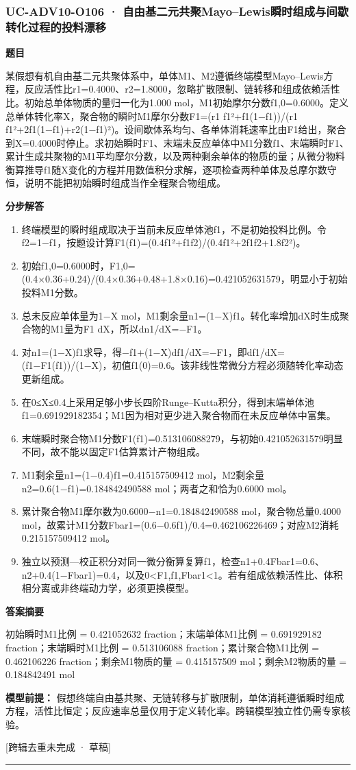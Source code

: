 \documentclass[UTF8,11pt,a4paper]{ctexart}
\begin{document}
\subsubsection*{UC-ADV10-O106 · 自由基二元共聚Mayo–Lewis瞬时组成与间歇转化过程的投料漂移}
\noindent\textbf{题目}\par
某假想有机自由基二元共聚体系中，单体M1、M2遵循终端模型Mayo–Lewis方程，反应活性比r1=0.4000、r2=1.8000，忽略扩散限制、链转移和组成依赖活性比。初始总单体物质的量归一化为1.000 mol，M1初始摩尔分数f1,0=0.6000。定义总单体转化率X，聚合物的瞬时M1摩尔分数F1=(r1 f1²+f1(1−f1))/(r1 f1²+2f1(1−f1)+r2(1−f1)²)。设间歇体系均匀、各单体消耗速率比由F1给出，聚合到X=0.4000时停止。求初始瞬时F1、末端未反应单体中M1分数f1、末端瞬时F1、累计生成共聚物的M1平均摩尔分数，以及两种剩余单体的物质的量；从微分物料衡算推导f1随X变化的方程并用数值积分求解，逐项检查两种单体及总摩尔数守恒，说明不能把初始瞬时组成当作全程聚合物组成。\par
\medskip\noindent\textbf{分步解答}
\begin{enumerate}
\item 终端模型的瞬时组成取决于当前未反应单体池f1，不是初始投料比例。令f2=1−f1，按题设计算F1(f1)=(0.4f1²+f1f2)/(0.4f1²+2f1f2+1.8f2²)。
\item 初始f1,0=0.6000时，F1,0=(0.4×0.36+0.24)/(0.4×0.36+0.48+1.8×0.16)=0.421052631579，明显小于初始投料M1分数。
\item 总未反应单体量为1−X mol，M1剩余量n1=(1−X)f1。转化率增加dX时生成聚合物的M1量为F1 dX，所以dn1/dX=−F1。
\item 对n1=(1−X)f1求导，得−f1+(1−X)df1/dX=−F1，即df1/dX=(f1−F1(f1))/(1−X)，初值f1(0)=0.6。该非线性常微分方程必须随转化率动态更新组成。
\item 在0≤X≤0.4上采用足够小步长四阶Runge–Kutta积分，得到末端单体池f1=0.691929182354；M1因为相对更少进入聚合物而在未反应单体中富集。
\item 末端瞬时聚合物M1分数F1(f1)=0.513106088279，与初始0.421052631579明显不同，故不能以固定F1估算累计产物组成。
\item M1剩余量n1=(1−0.4)f1=0.415157509412 mol，M2剩余量n2=0.6(1−f1)=0.184842490588 mol；两者之和恰为0.6000 mol。
\item 累计聚合物M1摩尔数为0.6000−n1=0.184842490588 mol，聚合物总量0.4000 mol，故累计M1分数Fbar1=(0.6−0.6f1)/0.4=0.462106226469；对应M2消耗0.215157509412 mol。
\item 独立以预测—校正积分对同一微分衡算复算f1，检查n1+0.4Fbar1=0.6、n2+0.4(1−Fbar1)=0.4，以及0<F1,f1,Fbar1<1。若有组成依赖活性比、体积相分离或非终端动力学，必须更换模型。
\end{enumerate}
\noindent\textbf{答案摘要}\par
初始瞬时M1比例 = 0.421052632 fraction；末端单体M1比例 = 0.691929182 fraction；末端瞬时M1比例 = 0.513106088 fraction；累计聚合物M1比例 = 0.462106226 fraction；剩余M1物质的量 = 0.415157509 mol；剩余M2物质的量 = 0.184842491 mol\par
\noindent\textbf{模型前提：}
假想终端自由基共聚、无链转移与扩散限制，单体消耗遵循瞬时组成方程，活性比恒定；反应速率总量仅用于定义转化率。跨辑模型独立性仍需专家核验。\par
\noindent\textcolor{red!65!black}{[跨辑去重未完成 · 草稿]} \par
\medskip\hrule\medskip
{}
\end{document}
